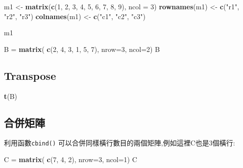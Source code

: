 \documentclass[]{book}
\newenvironment{Shaded}{\begin{snugshade}}{\end{snugshade}}
\newcommand{\KeywordTok}[1]{\textcolor[rgb]{0.13,0.29,0.53}{\textbf{#1}}}
\newcommand{\DataTypeTok}[1]{\textcolor[rgb]{0.13,0.29,0.53}{#1}}
\newcommand{\DecValTok}[1]{\textcolor[rgb]{0.00,0.00,0.81}{#1}}
\newcommand{\StringTok}[1]{\textcolor[rgb]{0.31,0.60,0.02}{#1}}
\newcommand{\NormalTok}[1]{#1}
\theoremstyle{definition}
\theoremstyle{definition}
\theoremstyle{definition}
\theoremstyle{remark}
\begin{document}
\begin{Shaded}
\begin{Highlighting}[]
\NormalTok{m1 <-}\StringTok{ }\KeywordTok{matrix}\NormalTok{(}\KeywordTok{c}\NormalTok{(}\DecValTok{1}\NormalTok{, }\DecValTok{2}\NormalTok{, }\DecValTok{3}\NormalTok{, }\DecValTok{4}\NormalTok{, }\DecValTok{5}\NormalTok{, }\DecValTok{6}\NormalTok{, }\DecValTok{7}\NormalTok{, }\DecValTok{8}\NormalTok{, }\DecValTok{9}\NormalTok{), }\DataTypeTok{ncol =} \DecValTok{3}\NormalTok{)}
\KeywordTok{rownames}\NormalTok{(m1) <-}\StringTok{ }\KeywordTok{c}\NormalTok{(}\StringTok{"r1"}\NormalTok{, }\StringTok{"r2"}\NormalTok{, }\StringTok{"r3"}\NormalTok{)}
\KeywordTok{colnames}\NormalTok{(m1) <-}\StringTok{ }\KeywordTok{c}\NormalTok{(}\StringTok{"c1"}\NormalTok{, }\StringTok{"c2"}\NormalTok{, }\StringTok{"c3"}\NormalTok{)}

\NormalTok{m1}
\end{Highlighting}
\end{Shaded}

\begin{Shaded}
\begin{Highlighting}[]
\NormalTok{ B =}\StringTok{ }\KeywordTok{matrix}\NormalTok{( }
    \KeywordTok{c}\NormalTok{(}\DecValTok{2}\NormalTok{, }\DecValTok{4}\NormalTok{, }\DecValTok{3}\NormalTok{, }\DecValTok{1}\NormalTok{, }\DecValTok{5}\NormalTok{, }\DecValTok{7}\NormalTok{), }
    \DataTypeTok{nrow=}\DecValTok{3}\NormalTok{, }
    \DataTypeTok{ncol=}\DecValTok{2}\NormalTok{) }
\NormalTok{B}
\end{Highlighting}
\end{Shaded}

\subsection{Transpose}\label{transpose}

\begin{Shaded}
\begin{Highlighting}[]
\KeywordTok{t}\NormalTok{(B)}
\end{Highlighting}
\end{Shaded}

\subsection{合併矩陣}

利用函數\texttt{cbind()}
可以合併同樣橫行數目的兩個矩陣,例如這裡C也是3個橫行:

\begin{Shaded}
\begin{Highlighting}[]
\NormalTok{C =}\StringTok{ }\KeywordTok{matrix}\NormalTok{( }
   \KeywordTok{c}\NormalTok{(}\DecValTok{7}\NormalTok{, }\DecValTok{4}\NormalTok{, }\DecValTok{2}\NormalTok{), }
   \DataTypeTok{nrow=}\DecValTok{3}\NormalTok{, }
   \DataTypeTok{ncol=}\DecValTok{1}\NormalTok{) }
\NormalTok{C}
\end{Highlighting}
\end{Shaded}
\end{document}
